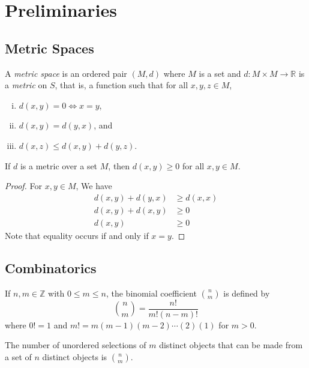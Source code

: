 \section{Preliminaries}

\subsection{Metric Spaces}

\begin{definition}
    A \textit{metric space} is an ordered pair $(M,d)$ where $M$ is a set and $d:M\times M\to \mathbb{R}$ is a \textit{metric} on $S$, that is, a function such that for all $x,y,z\in M$,
    \begin{enumerate}[(i)]
        \item $d(x,y)=0\iff x=y$,
        \item $d(x,y)=d(y,x)$, and
        \item $d(x,z)\leq d(x,y)+d(y,z)$.
    \end{enumerate}
\end{definition}

\begin{theorem}
    If $d$ is a metric over a set $M$, then $d(x,y)\geq 0$ for all $x,y\in M$.
\end{theorem}
\begin{proof}
    For $x,y\in M$, We have
    \begin{align*}
        d(x,y)+d(y,x)&\geq d(x,x) \\
        d(x,y)+d(x,y)&\geq 0 \\
        d(x,y)&\geq 0
    \end{align*}
    Note that equality occurs if and only if $x=y$.
\end{proof}

\subsection{Combinatorics}

If $n,m\in\mathbb{Z}$ with $0\leq m\leq n$, the binomial coefficient $\binom{n}{m}$ is defined by
$$\binom{n}{m}=\frac{n!}{m!(n-m)!}$$
where $0!=1$ and $m!=m(m-1)(m-2)\cdots(2)(1)$ for $m>0$.

\begin{lemma}
    The number of unordered selections of $m$ distinct objects that can be made from a set of $n$ distinct objects is $\binom{n}{m}$.
\end{lemma}

